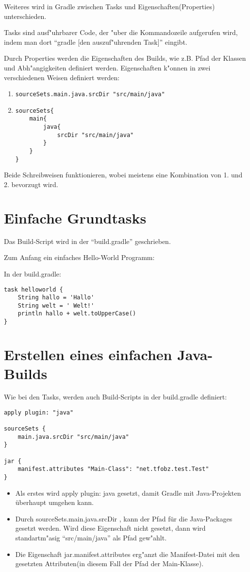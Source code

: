 \documentclass[a4paper]{article}
\begin{document}
Weiteres wird in Gradle zwischen Tasks und Eigenschaften(Properties) unterschieden.

Tasks sind ausf"uhrbarer Code, der "uber die Kommandozeile aufgerufen wird, indem man dort ``gradle [den auszuf"uhrenden Task]'' eingibt.

Durch Properties werden die Eigenschaften des Builds, wie z.B. Pfad der Klassen und Abh"angigkeiten definiert werden. Eigenschaften k"onnen in zwei verschiedenen Weisen definiert werden:
\begin{enumerate}
\item \begin{verbatim}
sourceSets.main.java.srcDir "src/main/java"
\end{verbatim}
\item \begin{verbatim}
sourceSets{
    main{
        java{
            srcDir "src/main/java"
        }
    }
}
\end{verbatim}
\end{enumerate}
Beide Schreibweisen funktionieren, wobei meistens eine Kombination von 1. und 2. bevorzugt wird.
\section{Einfache Grundtasks}
Das Build-Script wird in der ``build.gradle'' geschrieben.

Zum Anfang ein einfaches Hello-World Programm:

In der build.gradle:

\begin{verbatim}
task helloworld {
    String hallo = 'Hallo'
    String welt = ' Welt!'
    println hallo + welt.toUpperCase()
}
\end{verbatim}

\section{Erstellen eines einfachen Java-Builds}
Wie bei den Tasks, werden auch Build-Scripts in der build.gradle definiert:

\begin{verbatim}
apply plugin: "java"

sourceSets {
    main.java.srcDir "src/main/java"
}

jar {
    manifest.attributes "Main-Class": "net.tfobz.test.Test"
}
\end{verbatim}
\begin{itemize}
\item Als erstes wird apply plugin: java gesetzt, damit Gradle mit Java-Projekten überhaupt umgehen kann.
\item Durch sourceSets.main.java.srcDir , kann der Pfad für die Java-Packages gesetzt werden. Wird diese Eigenschaft nicht gesetzt, dann wird standartm"asig ``src/main/java'' als Pfad gew"ahlt.
\item Die Eigenschaft jar.manifest.attributes erg"anzt die Manifest-Datei mit den gesetzten Attributen(in diesem Fall der Pfad der Main-Klasse).
\end{itemize}
\end{document}
